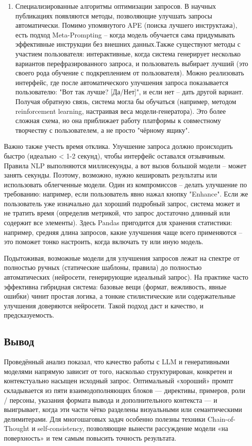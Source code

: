 \begin{enumerate}[label=\arabic*]
\item Специализированные алгоритмы оптимизации запросов. В научных публикациях появляются методы, позволяющие улучшать запросы автоматически. Помимо упомянутого APE (поиска лучшего инструктажа), есть подход Meta-Prompting – когда модель обучается сама придумывать эффективные инструкции без внешних данных.Также существуют методы с участием пользователя: интерактивные, когда система генерирует несколько вариантов перефразированного запроса, и пользователь выбирает лучший (это своего рода обучение с подкреплением от пользователя). Можно реализовать интерфейс, где после автоматического улучшения запроса показывается пользователю: "Вот так лучше? [Да/Нет]", и если нет – дать другой вариант. Получая обратную связь, система могла бы обучаться (например, методом reinforcement learning, настраивая веса модели-генератора). Это более сложная схема, но она приближает работу платформы к совместному творчеству с пользователем, а не просто "чёрному ящику".

\end{enumerate}

Важно также учесть время отклика. Улучшение запроса должно происходить быстро (идеально < 1-2 секунд), чтобы интерфейс оставался отзывчивым. Правила NLP выполняются миллисекунды, а вот вызов большой модели – может занять секунды. Поэтому, возможно, нужно кешировать результаты или использовать облегченные модели. Один из компромиссов – делать улучшение по требованию: например, если пользователь явно нажал кнопку "Enhance". Если же пользователь уже изначально дал хороший подробный запрос, система может и не тратить время (определив метрикой, что запрос достаточно длинный или содержит все элементы). Здесь Pandas пригодится для хранения статистики: например, средняя длина запросов, какие улучшения чаще всего применяются – это поможет тонко настроить, когда включать ту или иную модель.

Подытоживая, возможные модели для улучшения запросов лежат на спектре от полностью ручных (статические шаблоны, правила) до полностью автоматических (нейросети, генерирующие идеальный запрос). На практике часто эффективна гибридная система: базовые вещи (формат, вежливость, явные ошибки) чинит простая логика, а тонкие стилистические или содержательные улучшения доверяются нейросети. Такой подход даст и качество, и предсказуемость.


\subsection{Вывод}
Проведённый анализ показал, что качество работы с LLM и генеративными моделями напрямую зависит от того, насколько структурирован, конкретен и контекстуально насыщен исходный запрос. Оптимальный «хороший» промпт складывается из пяти взаимодополняющих блоков — директивы, примеров, роли / персоны, указания формата вывода и дополнительного контекста — и выигрывает, когда эти части чётко разделены визуальными или семантическими делимитерами. Для многошаговых задач особенно полезны техники Chain-of-Thought и self-consistency, позволяющие вынести рассуждение модели «на поверхность» и тем самым повысить точность результата.

